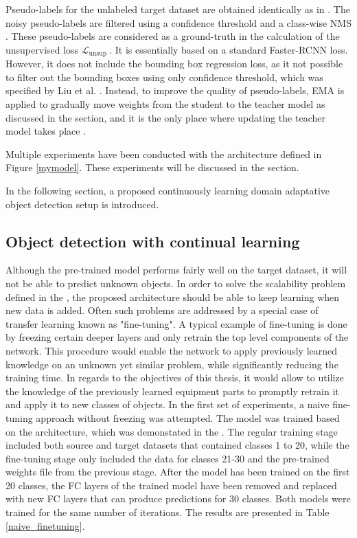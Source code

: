 \documentclass[english, 12pt, a4paper, elec, utf8, a-1b, online]{aaltothesis}
\begin{document}
Pseudo-labels for the unlabeled target dataset are obtained identically as in \cite{Li2021}. The noisy pseudo-labels are filtered using a confidence threshold and a class-wise NMS \cite{Liu2021}. These pseudo-labels are considered as a ground-truth in the calculation of the unsupervised loss $\mathcal{L}_{\text {unsup }}$. It is essentially based on a standard Faster-RCNN loss. However, it does not include the bounding box regression loss, as it not possible to filter out the bounding boxes using only confidence threshold, which was specified by Liu et al. \cite{Liu2021}.  Instead, to improve the quality of pseudo-labels, EMA is applied to gradually move weights from the student to the teacher model as discussed in the   section, and it is the only place where updating the teacher model takes place \cite{Li2021}.  
 
Multiple experiments have been conducted with the architecture defined in Figure \ref{mymodel}. These experiments will be discussed in the  section.  

In the following section, a proposed continuously learning domain adaptative object detection setup is introduced. 


\subsection{Object detection with continual learning}
\label{cont_learning_section} 
Although the pre-trained model performs fairly well on the target dataset, it will not be able to predict unknown objects. In order to solve the scalability problem defined in the , the proposed architecture should be able to keep learning when new data is added. Often such problems are addressed by a special case of transfer learning known as "fine-tuning". A typical example of fine-tuning is done by freezing certain deeper layers and only retrain the top level components of the network. This procedure would enable the network to apply previously learned knowledge on an unknown yet similar problem, while significantly reducing the training time. In regards to the objectives of this thesis, it would allow to utilize the knowledge of the previously learned equipment parts to promptly retrain it and apply it to new classes of objects. 
In the first set of experiments, a naive fine-tuning approach without freezing was attempted. The model was trained based on the architecture, which was demonstated in the . The regular training stage included both source and target datasets that contained classes 1 to 20, while the fine-tuning stage only included the data for classes 21-30 and the pre-trained weights file from the previous stage. After the model has been trained on the first 20 classes, the FC layers of the trained model have been removed and replaced with new FC layers that can produce predictions for 30 classes. Both models were trained for the same number of iterations. The results are presented in Table \ref{naive_finetuning}.
\end{document}
